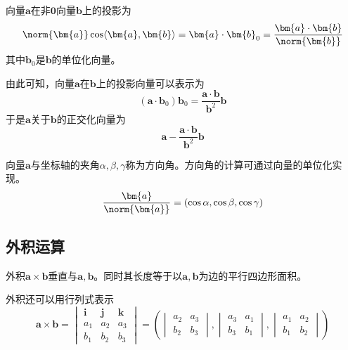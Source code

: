 向量$\bm{a}$在非$\bm{0}$向量$\bm{b}$上的投影为
\begin{equation}
    \norm{\bm{a}}\cos\langle\bm{a},\bm{b}\rangle = \bm{a}\cdot\bm{b}_0 = \frac{\bm{a}\cdot\bm{b}}{\norm{\bm{b}}}
\end{equation}
其中$\bm{b}_0$是$\bm{b}$的单位化向量。

由此可知，向量$\bm{a}$在$\bm{b}$上的投影向量可以表示为
\begin{equation}
    (\bm{a}\cdot\bm{b}_0)\bm{b}_0 = \frac{\bm{a}\cdot\bm{b}}{\bm{b}^2}\bm{b}
\end{equation}
于是$\bm{a}$关于$\bm{b}$的正交化向量为
\begin{equation}
    \bm{a} - \frac{\bm{a}\cdot\bm{b}}{\bm{b}^2}\bm{b}
\end{equation}

向量$\bm{a}$与坐标轴的夹角$\alpha,\beta,\gamma$称为方向角。方向角的计算可通过向量的单位化实现。
\begin{equation}
    \frac{\bm{a}}{\norm{\bm{a}}} = (\cos\alpha,\cos\beta,\cos\gamma)
\end{equation}

\subsection{外积运算}
外积$\bm{a}\times\bm{b}$垂直与$\bm{a},\bm{b}$。同时其长度等于以$\bm{a},\bm{b}$为边的平行四边形面积。

外积还可以用行列式表示
\begin{equation}
    \bm{a}\times\bm{b} =
    \begin{vmatrix}
        \bm{i} & \bm{j} & \bm{k} \\
        a_1    & a_2    & a_3    \\
        b_1    & b_2    & b_3
    \end{vmatrix}
    =
    \left(
    \begin{vmatrix}
            a_2 & a_3 \\
            b_2 & b_3
        \end{vmatrix},
    \begin{vmatrix}
            a_3 & a_1 \\
            b_3 & b_1
        \end{vmatrix},
    \begin{vmatrix}
            a_1 & a_2 \\
            b_1 & b_2
        \end{vmatrix}
    \right)
\end{equation}

